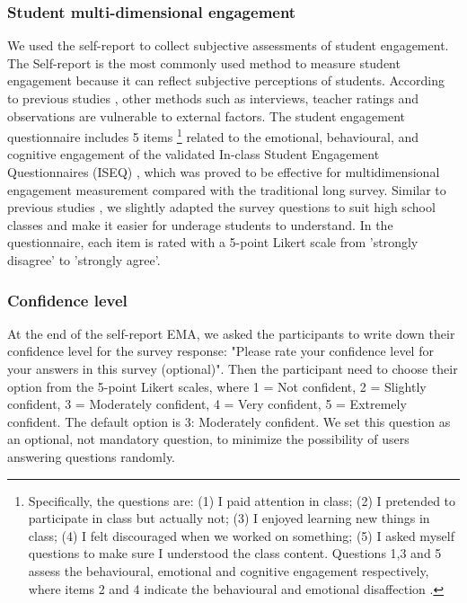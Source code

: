 \documentclass[sigconf]{acmart}
\begin{document}
\subsubsection{Student multi-dimensional engagement} We used the self-report to collect subjective assessments of student engagement. The Self-report is the most commonly used method to measure student engagement because it can reflect subjective perceptions of students. According to previous studies \cite{fredricks2004school,fredricks2012measurement}, other methods such as interviews, teacher ratings and observations are vulnerable to external factors. The student engagement questionnaire includes 5 items \footnote{Specifically, the questions are: (1) I paid attention in class; (2) I pretended to participate in class but actually not; (3) I enjoyed learning new things in class; (4) I felt discouraged when we worked on something; (5) I asked myself questions to make sure I understood the class content. Questions 1,3 and 5 assess the behavioural, emotional and cognitive engagement respectively, where items 2 and 4 indicate the
behavioural and emotional disaffection   \cite{fuller2018development,skinner2009motivational}.} related to the emotional, behavioural, and cognitive engagement of the validated In-class Student Engagement Questionnaires (ISEQ) \cite{fuller2018development}, which was proved to be effective for multidimensional engagement measurement compared with the traditional long survey. Similar to previous studies \cite{huynh2018engagemon,gashi2019using}, we slightly adapted the survey questions to suit high school classes and make it easier for underage students to understand. 
In the questionnaire, each item is rated with a 5-point Likert scale from ’strongly disagree’ to ’strongly agree’.



\subsubsection{Confidence level} At the end of the self-report EMA, we asked the participants to write down their confidence level for the survey response: "Please rate your confidence level for your answers in this survey (optional)". Then the participant need to choose their option from the 5-point Likert scales, where 1 = Not confident, 2 = Slightly confident, 3 = Moderately confident, 4 = Very confident, 5 = Extremely confident. The default option is 3: Moderately confident. We set this question as an optional, not mandatory question, to minimize the possibility of users answering questions randomly. 
\end{document}
